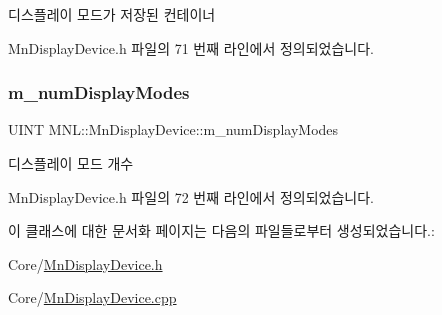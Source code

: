 디스플레이 모드가 저장된 컨테이너 



Mn\+Display\+Device.\+h 파일의 71 번째 라인에서 정의되었습니다.

\mbox{\label{class_m_n_l_1_1_mn_display_device_abdc40d78874813d1b4ce802a65247464}} 
\subsubsection{\texorpdfstring{m\+\_\+num\+Display\+Modes}{m\_numDisplayModes}}
{\footnotesize\ttfamily U\+I\+NT M\+N\+L\+::\+Mn\+Display\+Device\+::m\+\_\+num\+Display\+Modes\hspace{0.3cm}{\ttfamily [private]}}



디스플레이 모드 개수 



Mn\+Display\+Device.\+h 파일의 72 번째 라인에서 정의되었습니다.



이 클래스에 대한 문서화 페이지는 다음의 파일들로부터 생성되었습니다.\+:\begin{DoxyCompactItemize}
\item 
Core/\hyperlink{_mn_display_device_8h}{Mn\+Display\+Device.\+h}\item 
Core/\hyperlink{_mn_display_device_8cpp}{Mn\+Display\+Device.\+cpp}\end{DoxyCompactItemize}
